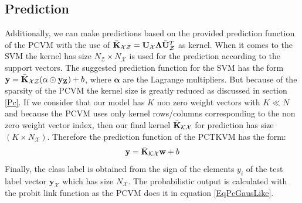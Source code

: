 \subsection{Prediction}\label{InSubSecPrediction}
Additionally, we can make predictions based on the provided prediction function of the \acs{PCVM} with the use of $\bar{\mathbf{K}}_\mathcal{XZ} = \mathbf{U}_\mathcal{X}\mathbf{\Lambda}\bar{\mathbf{U}}_\mathcal{Z}^T$ as kernel.
When it comes to the \acs{SVM} the kernel has size $N_\mathcal{Z}\times N_\mathcal{X}$ is used for the prediction according to the support vectors.
The suggested prediction function for the \acs{SVM} has the form $\mathbf{y} = \bar{\mathbf{K}}_\mathcal{XZ}(\mathbf{\alpha}\odot\mathbf{y}_\mathbf{Z})+b$, where $\mathbf{\alpha}$ are the Lagrange multipliers.\cite{Long.2015}\newline
But because of the sparsity of the \acs{PCVM} the kernel size is greatly reduced as discussed in section \ref{Pc}.
If we consider that our model has $K$ non zero weight vectors with $K\ll N$ and because the \acs{PCVM} uses only kernel rows/columns corresponding to the non zero weight vector index, then our final kernel $\bar{\mathbf{K}}_\mathcal{KX}$ for prediction has size $(K\times N_\mathcal{X})$.
Therefore the prediction function of the \acs{PCTKVM} has the form:
\begin{equation}
\mathbf{y} = \bar{\mathbf{K}}_\mathcal{KX}\mathbf{w}+b
\end{equation}
Finally, the class label is obtained from the sign of the elements $y_i$ of the test label vector $\mathbf{y}_\mathcal{X}$ which has size $N_\mathcal{X}$.
The probabilistic output is calculated with the probit link function as the \acs{PCVM} does it in equation \ref{EqPcGausLike}.

